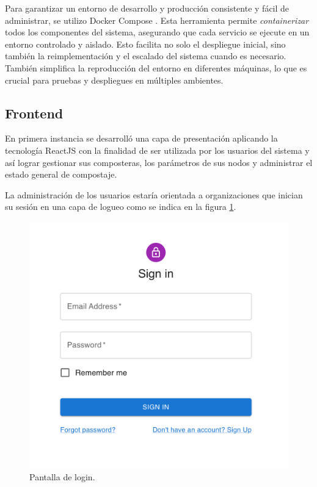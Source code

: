 Para garantizar un entorno de desarrollo y producción consistente y fácil de administrar, se utilizo Docker Compose \citep{DockerCompose}. Esta herramienta permite \textit{containerizar} todos los componentes del sistema, asegurando que cada servicio se ejecute en un entorno controlado y aislado. Esto facilita no solo el despliegue inicial, sino también la reimplementación y el escalado del sistema cuando es necesario. También simplifica la reproducción del entorno en diferentes máquinas, lo que es crucial para pruebas y despliegues en múltiples ambientes.

\subsection{Frontend}

En primera instancia se desarrolló una capa de presentación aplicando la tecnología ReactJS con la finalidad de ser utilizada por los usuarios del sistema y así lograr gestionar sus composteras, los parámetros de sus nodos y administrar el estado general de compostaje. 

La administración de los usuarios estaría orientada a organizaciones que inician su sesión en una capa de logueo como se indica en la figura \ref{fig:login}. 

\begin{figure}[H]
	\centering
	\includegraphics[scale=.2]{./Figures/PortalWeb/Login.jpeg}
	\caption{Pantalla de login.}
	\label{fig:login}
\end{figure}

